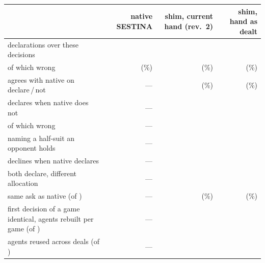 \begin{tabularx}{\linewidth}{Q{1.75}N{0.65}N{0.8}N{0.8}}
\toprule
 & native SESTINA & shim, current hand (rev.~2) & shim, hand as dealt \\
\midrule
declarations over these decisions & \kcPrNativeDecl{} & \kcPrCurDecl{} & \kcPrDealtDecl{} \\
of which wrong & \kcPrNativeWrong{} (\kcPrNativeWrongPct{}\%) & \kcPrCurWrong{} (\kcPrCurWrongPct{}\%) & \kcPrDealtWrong{} (\kcPrDealtWrongPct{}\%) \\
agrees with native on declare\,/\,not & --- & \kcPrCurAgree{} (\kcPrCurAgreePct{}\%) & \kcPrDealtAgree{} (\kcPrDealtAgreePct{}\%) \\
declares when native does not & --- & \kcPrCurOnly{} & \kcPrDealtOnly{} \\
\quad of which wrong & --- & \kcPrCurOnlyWrong{} & \kcPrDealtOnlyWrong{} \\
\quad naming a half-suit an opponent holds & --- & \kcPrCurOnlyOwn{} & \kcPrDealtOnlyOwn{} \\
declines when native declares & --- & \kcPrCurNativeOnly{} & \kcPrDealtNativeOnly{} \\
both declare, different allocation & --- & \kcPrCurBothDiff{} & \kcPrDealtBothDiff{} \\
same ask as native (of \kcPrAskCompared{}) & --- & \kcPrCurAsk{} (\kcPrCurAskPct{}\%) & \kcPrDealtAsk{} (\kcPrDealtAskPct{}\%) \\
first decision of a game identical, agents rebuilt per game (of \kcPrFreshFirst{}) & --- & \kcPrFreshFirstCur{} & \kcPrFreshFirstDealt{} \\
\quad agents reused across deals (of \kcPrFirst{}) & --- & \kcPrFirstCur{} & \kcPrFirstDealt{} \\
\bottomrule
\end{tabularx}
